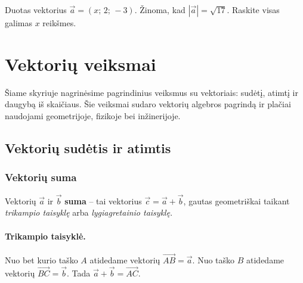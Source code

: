 \begin{exercise}
Duotas vektorius $\vec{a} = (x;\,2;\,-3)$. Žinoma, kad $|\vec{a}| = \sqrt{17}$. 
Raskite visas galimas $x$ reikšmes.
\end{exercise}


\section{Vektorių veiksmai}

Šiame skyriuje nagrinėsime pagrindinius veiksmus su vektoriais: sudėtį, atimtį ir
daugybą iš skaičiaus. Šie veiksmai sudaro vektorių algebros pagrindą ir plačiai
naudojami geometrijoje, fizikoje bei inžinerijoje.

\subsection{Vektorių sudėtis ir atimtis}

\subsubsection*{Vektorių suma}

\begin{definition}
Vektorių $\vec{a}$ ir $\vec{b}$ \textbf{suma} – tai vektorius $\vec{c} = \vec{a} + \vec{b}$,
gautas geometriškai taikant \emph{trikampio taisyklę} arba
\emph{lygiagretainio taisyklę}.
\end{definition}

\paragraph{Trikampio taisyklė.}
Nuo bet kurio taško $A$ atidedame vektorių $\overrightarrow{AB} = \vec{a}$.
Nuo taško $B$ atidedame vektorių $\overrightarrow{BC} = \vec{b}$.
Tada $\vec{a} + \vec{b} = \overrightarrow{AC}$.

\begin{center}
\end{center}

